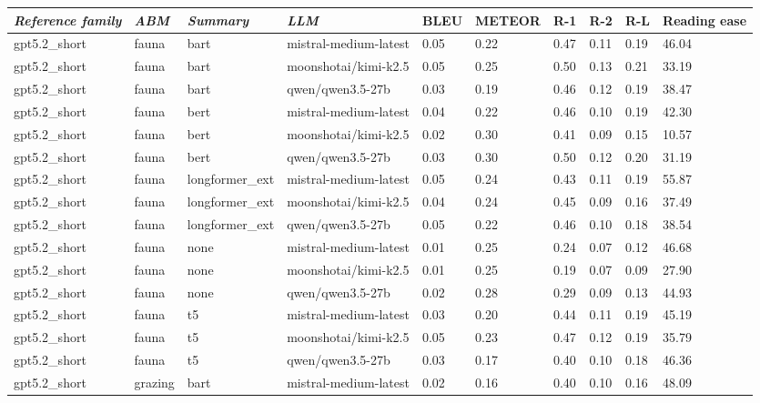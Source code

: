 \begin{tabular}{|l|l|l|l|l|l|l|l|l|l|}
\hline
\textit{\textbf{Reference family}} & \textit{\textbf{ABM}} & \textit{\textbf{Summary}} & \textit{\textbf{LLM}} & BLEU & METEOR & R-1 & R-2 & R-L & Reading ease \\
 \hline
 gpt5.2\_short & fauna & bart & mistral-medium-latest & 0.05 & 0.22 & 0.47 & 0.11 & 0.19 & 46.04 \\
 \hline
 gpt5.2\_short & fauna & bart & moonshotai/kimi-k2.5 & 0.05 & 0.25 & 0.50 & 0.13 & 0.21 & 33.19 \\
 \hline
 gpt5.2\_short & fauna & bart & qwen/qwen3.5-27b & 0.03 & 0.19 & 0.46 & 0.12 & 0.19 & 38.47 \\
 \hline
 gpt5.2\_short & fauna & bert & mistral-medium-latest & 0.04 & 0.22 & 0.46 & 0.10 & 0.19 & 42.30 \\
 \hline
 gpt5.2\_short & fauna & bert & moonshotai/kimi-k2.5 & 0.02 & 0.30 & 0.41 & 0.09 & 0.15 & 10.57 \\
 \hline
 gpt5.2\_short & fauna & bert & qwen/qwen3.5-27b & 0.03 & 0.30 & 0.50 & 0.12 & 0.20 & 31.19 \\
 \hline
 gpt5.2\_short & fauna & longformer\_ext & mistral-medium-latest & 0.05 & 0.24 & 0.43 & 0.11 & 0.19 & 55.87 \\
 \hline
 gpt5.2\_short & fauna & longformer\_ext & moonshotai/kimi-k2.5 & 0.04 & 0.24 & 0.45 & 0.09 & 0.16 & 37.49 \\
 \hline
 gpt5.2\_short & fauna & longformer\_ext & qwen/qwen3.5-27b & 0.05 & 0.22 & 0.46 & 0.10 & 0.18 & 38.54 \\
 \hline
 gpt5.2\_short & fauna & none & mistral-medium-latest & 0.01 & 0.25 & 0.24 & 0.07 & 0.12 & 46.68 \\
 \hline
 gpt5.2\_short & fauna & none & moonshotai/kimi-k2.5 & 0.01 & 0.25 & 0.19 & 0.07 & 0.09 & 27.90 \\
 \hline
 gpt5.2\_short & fauna & none & qwen/qwen3.5-27b & 0.02 & 0.28 & 0.29 & 0.09 & 0.13 & 44.93 \\
 \hline
 gpt5.2\_short & fauna & t5 & mistral-medium-latest & 0.03 & 0.20 & 0.44 & 0.11 & 0.19 & 45.19 \\
 \hline
 gpt5.2\_short & fauna & t5 & moonshotai/kimi-k2.5 & 0.05 & 0.23 & 0.47 & 0.12 & 0.19 & 35.79 \\
 \hline
 gpt5.2\_short & fauna & t5 & qwen/qwen3.5-27b & 0.03 & 0.17 & 0.40 & 0.10 & 0.18 & 46.36 \\
 \hline
 gpt5.2\_short & grazing & bart & mistral-medium-latest & 0.02 & 0.16 & 0.40 & 0.10 & 0.16 & 48.09 \\

\end{tabular}
